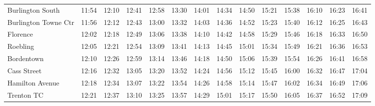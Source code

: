 \begin{center}
\begin{tabular}{@{}lrrrrrrrrrrrrr@{}}
Burlington South & 11:54 & 12:10 & 12:41 & 12:58 & 13:30 & 14:01 & 14:34 & 14:50 & 15:21 & 15:38 & 16:10 & 16:23 & 16:41 \\
Burlington Towne Ctr & 11:56 & 12:12 & 12:43 & 13:00 & 13:32 & 14:03 & 14:36 & 14:52 & 15:23 & 15:40 & 16:12 & 16:25 & 16:43 \\
Florence & 12:02 & 12:18 & 12:49 & 13:06 & 13:38 & 14:10 & 14:42 & 14:58 & 15:29 & 15:46 & 16:18 & 16:33 & 16:50 \\
Roebling & 12:05 & 12:21 & 12:54 & 13:09 & 13:41 & 14:13 & 14:45 & 15:01 & 15:34 & 15:49 & 16:21 & 16:36 & 16:53 \\
Bordentown & 12:10 & 12:26 & 12:59 & 13:14 & 13:46 & 14:18 & 14:50 & 15:06 & 15:39 & 15:54 & 16:26 & 16:41 & 16:58 \\
Cass Street & 12:16 & 12:32 & 13:05 & 13:20 & 13:52 & 14:24 & 14:56 & 15:12 & 15:45 & 16:00 & 16:32 & 16:47 & 17:04 \\
Hamilton Avenue & 12:18 & 12:34 & 13:07 & 13:22 & 13:54 & 14:26 & 14:58 & 15:14 & 15:47 & 16:02 & 16:34 & 16:49 & 17:06 \\
Trenton TC & 12:21 & 12:37 & 13:10 & 13:25 & 13:57 & 14:29 & 15:01 & 15:17 & 15:50 & 16:05 & 16:37 & 16:52 & 17:09 \\
\bottomrule\end{tabular}\end{center}
